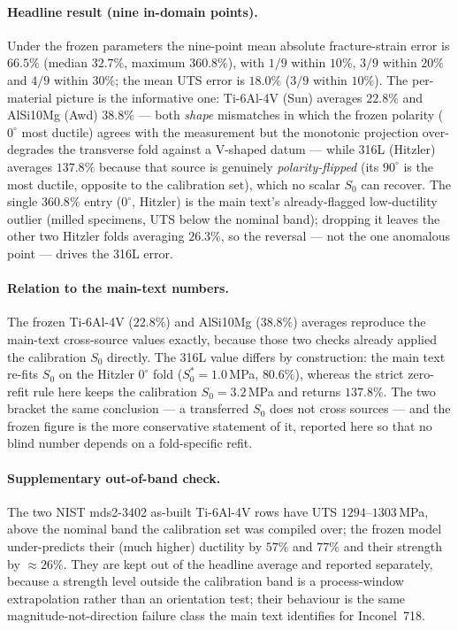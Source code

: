 \documentclass[12pt,a4paper,twocolumn]{article}
\begin{document}
\paragraph{Headline result (nine in-domain points).}
Under the frozen parameters the nine-point mean absolute fracture-strain error is $66.5\%$ (median
$32.7\%$, maximum $360.8\%$), with $1/9$ within $10\%$, $3/9$ within $20\%$ and $4/9$ within $30\%$; the
mean UTS error is $18.0\%$ ($3/9$ within $10\%$). The per-material picture is the informative one:
Ti-6Al-4V (Sun) averages $22.8\%$ and AlSi10Mg (Awd) $38.8\%$ --- both \emph{shape} mismatches in which
the frozen polarity ($0^\circ$ most ductile) agrees with the measurement but the monotonic projection
over-degrades the transverse fold against a V-shaped datum --- while 316L (Hitzler) averages $137.8\%$
because that source is genuinely \emph{polarity-flipped} (its $90^\circ$ is the most ductile, opposite to
the calibration set), which no scalar $S_0$ can recover. The single $360.8\%$ entry ($0^\circ$, Hitzler) is
the main text's already-flagged low-ductility outlier (milled specimens, UTS below the nominal band);
dropping it leaves the other two Hitzler folds averaging $26.3\%$, so the reversal --- not the one anomalous
point --- drives the 316L error.

\paragraph{Relation to the main-text numbers.}
The frozen Ti-6Al-4V ($22.8\%$) and AlSi10Mg ($38.8\%$) averages reproduce the main-text cross-source
values exactly, because those two checks already applied the calibration $S_0$ directly. The 316L value
differs by construction: the main text re-fits $S_0$ on the Hitzler $0^\circ$ fold ($S_0^* = 1.0$\,MPa,
$80.6\%$), whereas the strict zero-refit rule here keeps the calibration $S_0 = 3.2$\,MPa and returns
$137.8\%$. The two bracket the same conclusion --- a transferred $S_0$ does not cross sources --- and the
frozen figure is the more conservative statement of it, reported here so that no blind number depends on
a fold-specific refit.

\paragraph{Supplementary out-of-band check.}
The two NIST mds2-3402 as-built Ti-6Al-4V rows have UTS $1294$--$1303$\,MPa, above the nominal band the
calibration set was compiled over; the frozen model under-predicts their (much higher) ductility by
$57\%$ and $77\%$ and their strength by $\approx 26\%$. They are kept out of the headline average and
reported separately, because a strength level outside the calibration band is a process-window
extrapolation rather than an orientation test; their behaviour is the same magnitude-not-direction failure
class the main text identifies for Inconel~718.
\end{document}
